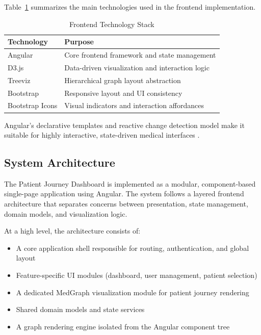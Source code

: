 \documentclass{article}
\begin{document}
Table~\ref{tab:frontend_stack} summarizes the main technologies used in the
frontend implementation.

\begin{table}[H]
    \centering
    \caption{Frontend Technology Stack}
    \label{tab:frontend_stack}
    \begin{tabular}{|l|l|}
        \hline
        \textbf{Technology} & \textbf{Purpose}                                \\
        \hline
        Angular             & Core frontend framework and state management    \\
        D3.js               & Data-driven visualization and interaction logic \\
        Treeviz             & Hierarchical graph layout abstraction           \\
        Bootstrap           & Responsive layout and UI consistency            \\
        Bootstrap Icons     & Visual indicators and interaction affordances   \\
        \hline
    \end{tabular}
\end{table}

Angular’s declarative templates and reactive change detection model make it
suitable for highly interactive, state-driven medical interfaces
\cite{angularDocs}.

\subsection{System Architecture}
\label{sec:system-architecture}

The Patient Journey Dashboard is implemented as a modular, component-based
single-page application using Angular. The system follows a layered frontend
architecture that separates concerns between presentation, state management,
domain models, and visualization logic.

At a high level, the architecture consists of:
\begin{itemize}
    \item A core application shell responsible for routing, authentication, and global
          layout
    \item Feature-specific UI modules (dashboard, user management, patient selection)
    \item A dedicated MedGraph visualization module for patient journey rendering
    \item Shared domain models and state services
    \item A graph rendering engine isolated from the Angular component tree
\end{itemize}
\end{document}
